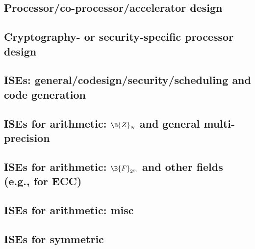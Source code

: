 
\subsection*{Processor/co-processor/accelerator design}
\cite{SCARV:Gutmann:00}
\cite{SCARV:WuWeaAus:01}
\cite{SCARV:MTRGS:99}
\cite{SCARV:GGHJPTW:11}
\cite{SCARV:CosLebDev:16}

\subsection*{Cryptography- or security-specific processor design}
\cite{SCARV:FouMoo:05,SCARV:Fournier:07,SCARV:KocSavGro:08,SCARV:TheSisPne:09,SCARV:TilKirSze:10,SCARV:NREAMM:12,SCARV:YumSav:15,SCARV:RagAmbPar:15,SCARV:AweAus:17,SCARV:YHEF:18}

\subsection*{ISEs: general/codesign/security/scheduling and code generation}
\cite{SCARV:Fiskiran:05}
\cite{SCARV:BarGioMar:09}
\cite{SCARV:RegIen:16}
\cite{SCARV:FazLopOli:18}
\cite{SCARV:KLWGSTW:06,SCARV:GIPTV:06}
\cite{SCARV:RCSBKBLI:09}
\cite{SCARV:ManGre:10,SCARV:ManMagGre:10,SCARV:Manley:11}

\subsection*{ISEs for arithmetic: $\B{Z}_{N}$ and general multi-precision}
\cite{SCARV:Gro:02,SCARV:Gro:03,SCARV:GroKam:03:a,SCARV:GAST:05,SCARV:GroTilSze:07}
\subsection*{ISEs for arithmetic: $\B{F}_{2^m}$ and other fields (e.g., for ECC)}
\cite{SCARV:GroKam:03:b,SCARV:FisLee:04,SCARV:GroKumPaa:04,SCARV:KumPaa:04,SCARV:BBGM:08}
\subsection*{ISEs for arithmetic: misc}
\cite{SCARV:GroKam:03,SCARV:GroSav:04,SCARV:VejPagGro:07}

\subsection*{ISEs for symmetric}
\cite{SCARV:BurMcDAus:00,SCARV:MelElb:08,SCARV:MelElb:10}

